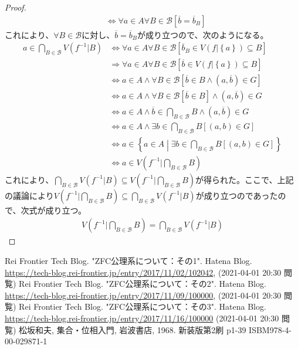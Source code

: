 \documentclass[a4paper]{jsarticle}
\begin{document}
\begin{proof}
\begin{align*}
&\Leftrightarrow \forall a \in A\forall B\in \mathcal{B}\left[ \overline{b} = {\overline{b}}_{B} \right]
\end{align*}
これにより、$\forall B\in \mathcal{B}$に対し、$\overline{b} = {\overline{b}}_{B}$が成り立つので、次のようになる。
\begin{align*}
a \in \bigcap_{B\in \mathcal{B}} {V\left( f^{- 1}|B \right)} &\Leftrightarrow \forall a \in A\forall B\in \mathcal{B}\left[ {\overline{b}}_{B} \in V\left( f|\left\{ a \right\} \right) \subseteq B \right]\\
&\Rightarrow \forall a \in A\forall B\in \mathcal{B}\left[ \overline{b} \in V\left( f|\left\{ a \right\} \right) \subseteq B \right]\\
&\Leftrightarrow a \in A \land \forall B\in \mathcal{B}\left[ \overline{b} \in B \land \left( a,\overline{b} \right) \in G \right]\\
&\Leftrightarrow a \in A \land \forall B\in \mathcal{B}\left[ \overline{b} \in B \right] \land \left( a,\overline{b} \right) \in G\\
&\Leftrightarrow a \in A \land \overline{b} \in \bigcap_{B\in \mathcal{B}} B \land \left( a,\overline{b} \right) \in G\\
&\Leftrightarrow a \in A \land \exists b \in \bigcap_{B\in \mathcal{B}} B\left[ (a,b) \in G \right]\\
&\Leftrightarrow a \in \left\{ a \in A \middle| \exists b \in \bigcap_{B\in \mathcal{B}} B\left[ (a,b) \in G \right] \right\}\\
&\Leftrightarrow a \in V\left( f^{- 1}|\bigcap_{B\in \mathcal{B}} B \right)
\end{align*}
これにより、$\bigcap_{B\in \mathcal{B}} {V\left( f^{- 1}|B \right)} \subseteq V\left( f^{- 1}|\bigcap_{B\in \mathcal{B}} B \right)$が得られた。ここで、上記の議論により$V\left( f^{- 1}|\bigcap_{B\in \mathcal{B}} B \right) \subseteq \bigcap_{B\in \mathcal{B}} {V\left( f^{- 1}|B \right)}$が成り立つのであったので、次式が成り立つ。
\begin{align*}
V\left( f^{- 1}|\bigcap_{B\in \mathcal{B}} B \right) = \bigcap_{B\in \mathcal{B}} {V\left( f^{- 1}|B \right)}
\end{align*}
\end{proof}
\begin{thebibliography}{50}
    Rei Frontier Tech Blog. "ZFC公理系について：その1". Hatena Blog. \url{https://tech-blog.rei-frontier.jp/entry/2017/11/02/102042}, (2021-04-01 20:30 閲覧)
    Rei Frontier Tech Blog. "ZFC公理系について：その2". Hatena Blog. \url{https://tech-blog.rei-frontier.jp/entry/2017/11/09/100000}, (2021-04-01 20:30 閲覧)
    Rei Frontier Tech Blog. "ZFC公理系について：その3". Hatena Blog. \url{https://tech-blog.rei-frontier.jp/entry/2017/11/16/100000} (2021-04-01 20:30 閲覧)
    松坂和夫, 集合・位相入門, 岩波書店, 1968. 新装版第2刷 p1-39 ISBM978-4-00-029871-1
\end{thebibliography}
\end{document}
